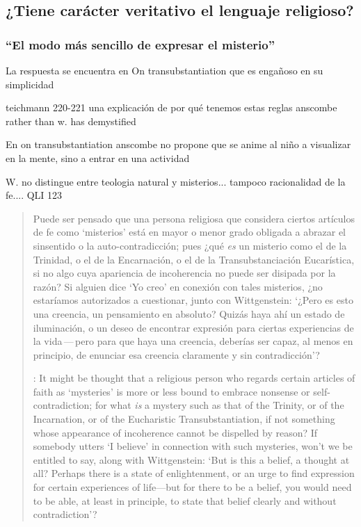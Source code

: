 \subsection{¿Tiene carácter veritativo el lenguaje religioso?}

\subsubsection{``El modo más sencillo de expresar el misterio''}

La respuesta se encuentra en On transubstantiation que es engañoso en su simplicidad

teichmann 220-221
una explicación de por qué tenemos estas reglas anscombe rather than w. has demystified

En on transubstantiation anscombe no propone que se anime al niño a visualizar en la mente, sino a entrar en una actividad

W. no distingue entre teologia natural y misterios... tampoco racionalidad de la fe.... QLI 123

\blockquote[{\cite[211]{teichmann2008ans}}: It might be thought that a religious person who regards certain articles of faith as `mysteries' is more or less bound to embrace nonsense or self-contradiction; for what \emph{is} a mystery such as that of the Trinity, or of the Incarnation, or of the Eucharistic Transubstantiation, if not something whose appearance of incoherence cannot be dispelled by reason? If somebody utters `I believe' in connection with such mysteries, won't we be entitled to say, along with Wittgenstein: `But is this a belief, a thought at all? Perhaps there is a state of enlightenment, or an urge to find expression for certain experiences of life---but for there to be a belief, you would need to be able, at least in principle, to state that belief clearly and without contradiction'?]{Puede ser pensado que una persona religiosa que considera ciertos artículos de fe como `misterios' está en mayor o menor grado obligada a abrazar el sinsentido o la auto-contradicción; pues ¿qué \emph{es} un misterio como el de la Trinidad, o el de la Encarnación, o el de la Transubstanciación Eucarística, si no algo cuya apariencia de incoherencia no puede ser disipada por la razón? Si alguien dice `Yo creo' en conexión con tales misterios, ¿no estaríamos autorizados a cuestionar, junto con Wittgenstein: `¿Pero es esto una creencia, un pensamiento en absoluto? Quizás haya ahí un estado de iluminación, o un deseo de encontrar expresión para ciertas experiencias de la vida\,---\,pero para que haya una creencia, deberías ser capaz, al menos en principio, de enunciar esa creencia claramente y sin contradicción'?}

